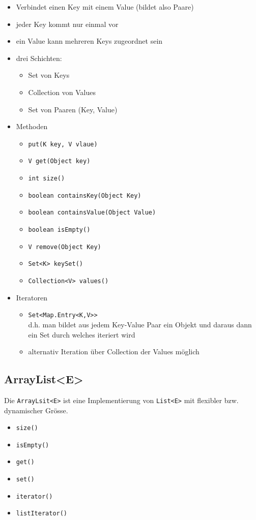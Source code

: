 \begin{itemize}
	\item Verbindet einen Key mit einem Value (bildet also Paare)
	\item jeder Key kommt nur einmal vor
	\item ein Value kann mehreren Keys zugeordnet sein
	\item drei Schichten:
		\begin{itemize}
			\item Set von Keys
			\item Collection von Values
			\item Set von Paaren (Key, Value)
		\end{itemize}
	\item Methoden
		\begin{itemize}
			\item \lstinline{put(K key, V vlaue)}
			\item \lstinline{V get(Object key)}
			\item \lstinline{int size()}
			\item \lstinline{boolean containsKey(Object Key)}
			\item \lstinline{boolean containsValue(Object Value)}
			\item \lstinline{boolean isEmpty()}
			\item \lstinline{V remove(Object Key)}
			\item \lstinline{Set<K> keySet()}
			\item \lstinline{Collection<V> values()}
		\end{itemize}
	\item Iteratoren
		\begin{itemize}
			\item \lstinline{Set<Map.Entry<K,V>>} \\
				d.h. man bildet aus jedem Key-Value
				Paar ein Objekt und daraus dann ein Set
				durch welches iteriert wird
			\item alternativ Iteration über Collection der
				Values möglich
		\end{itemize}
\end{itemize}

\subsection{ArrayList<E>}
Die \lstinline{ArrayLsit<E>} ist eine Implementierung von 
\lstinline{List<E>} mit flexibler bzw. dynamischer Grösse.

\begin{itemize}
	\item \lstinline{size()}
	\item \lstinline{isEmpty()}
	\item \lstinline{get()}
	\item \lstinline{set()}
	\item \lstinline{iterator()}
	\item \lstinline{listIterator()}
\end{itemize}


